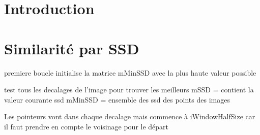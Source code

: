 \documentclass[a4paper,10pt]{article}
\title{}
\author{}
\begin{document}
\maketitle

\section{Introduction}

\section{Similarité par SSD}
premiere boucle initialise la matrice mMinSSD avec la plus haute valeur possible

test tous les decalages de l'image pour trouver les meilleurs
mSSD = contient la valeur courante ssd
mMinSSD = ensemble des ssd des points des images

Les pointeurs vont dans chaque decalage mais commence à iWindowHalfSize
car il faut prendre en compte le voisinage pour le départ
\end{document}
